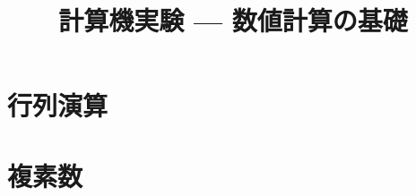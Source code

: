 \documentclass[10pt,dvipdfmx]{beamer}
\title{計算機実験 --- 数値計算の基礎}
\begin{document}
\begin{frame}
  \titlepage
  \tableofcontents
\end{frame}





\section{行列演算}

\section{複素数}




\end{document}
